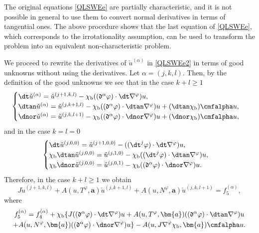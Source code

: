 \begin{remark}
The original equations \eqref{QLSWEe} are partially characteristic,
and it is not possible in general to use them to convert normal derivatives in terms of tangential ones.
The above procedure shows that the last equation of \eqref{QLSWEe}, which corresponds to the irrotationality assumption,
can be used to transform the problem into an equivalent non-characteristic problem.
\end{remark}

\Changel

We proceed to rewrite the derivatives of $\check{u}^{(\alpha)}$ in \eqref{QLSWEe2} in terms of good unknowns without using the derivatives.
Let $\alpha=(j,k,l)$.
Then, by the definition of the good unknowns we see that in the case $k+l\geq1$
\begin{equation}\label{DGU1}
\begin{cases}
\dt\check{u}^{(\alpha)} = \check{u}^{(j+1,k,l)} - \chi_\mathrm{b}((\mathfrak{d}^\alpha\varphi)\cdot\dt\nabla^\varphi)u, \\
\dtan\check{u}^{(\alpha)} = \check{u}^{(j,k+1,l)} - \chi_\mathrm{b}((\mathfrak{d}^\alpha\varphi)\cdot\dtan\nabla^\varphi)u
+ (\dtan\chi_\mathrm{b}) \cmfalpha u, \\
\dnor\check{u}^{(\alpha)} = \check{u}^{(j,k,l+1)} - \chi_\mathrm{b}((\mathfrak{d}^\alpha\varphi)\cdot\dnor\nabla^\varphi)u
+ (\dnor\chi_\mathrm{b}) \cmfalpha u,
\end{cases}
\end{equation}
and in the case $k=l=0$
\begin{equation}\label{DGU2}
\begin{cases}
\dt\check{u}^{(j,0,0)} = \check{u}^{(j+1,0,0)} - ((\dt^j\varphi)\cdot\dt\nabla^\varphi)u, \\
\chi_\mathrm{b}\dtan\check{u}^{(j,0,0)} = \check{u}^{(j,1,0)} - \chi_\mathrm{b}((\dt^j\varphi)\cdot\dtan\nabla^\varphi)u, \\
\chi_\mathrm{b}\dnor\check{u}^{(j,0,0)} = \check{u}^{(j,0,1)} - \chi_\mathrm{b}((\mathfrak{d}^\alpha\varphi)\cdot\dnor\nabla^\varphi)u.
\end{cases}
\end{equation}
Therefore, in the case $k+l\geq1$ we obtain
\begin{equation}\label{QLSWEe3}
J\check{u}^{(j+1,k,l)}+A(u,T^\varphi,\bm{a})\check{u}^{(j,k+1,l)}+A(u,N^\varphi,\bm{a})\check{u}^{(j,k,l+1)}=f_5^{(\alpha)},
\end{equation}
where
\begin{multline*}
f_5^{(\alpha)}
= f_4^{(\alpha)} + \chi_\mathrm{b} \{ J((\mathfrak{d}^\alpha\varphi)\cdot\dt\nabla^\varphi)u
+ A(u,T^\varphi,\bm{a})((\mathfrak{d}^\alpha\varphi)\cdot\dtan\nabla^\varphi)u \\
+ A(u,N^\varphi,\bm{a})((\mathfrak{d}^\alpha\varphi)\cdot\dnor\nabla^\varphi)u \}
- A(u,J\nabla^\varphi\chi_\mathrm{b},\bm{a}) \cmfalpha u.
\end{multline*}
